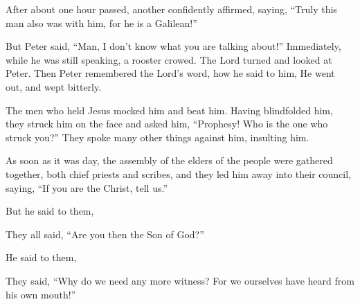 {\par }{\PP {}After about one hour passed, another confidently affirmed, saying, “Truly this man also was with him, for he is a Galilean!”
\par }{\PP {}But Peter said, “Man, I don’t know what you are talking about!” Immediately, while he was still speaking, a rooster crowed.
The Lord turned and looked at Peter. Then Peter remembered the Lord’s word, how he said to him,
{}
He went out, and wept bitterly.
\par }{\PP {}The men who held Jesus mocked him and beat him.
Having blindfolded him, they struck him on the face and asked him, “Prophesy! Who is the one who struck you?”
They spoke many other things against him, insulting him.
\par }{\PP {}As soon as it was day, the assembly of the elders of the people were gathered together, both chief priests and scribes, and they led him away into their council, saying,
“If you are the Christ, tell us.”
\par }{\PP But he said to them,
{}
\par }{\PP {}They all said, “Are you then the Son of God?”
\par }{\PP He said to them,
{}
\par }{\PP {}They said, “Why do we need any more witness? For we ourselves have heard from his own mouth!”

}
